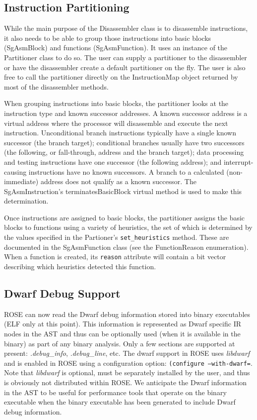 \subsection{Instruction Partitioning}

While the main purpose of the Disassembler class is to disassemble instructions, it also
needs to be able to group those instructions into basic blocks (SgAsmBlock) and functions
(SgAsmFunction). It uses an instance of the Partitioner class to do so.  The
user can supply a partitioner to the disassembler or have the disassembler create a
default partitioner on the fly.  The user is also free to call the partitioner directly
on the InstructionMap object returned by most of the disassembler methods.

When grouping instructions into basic blocks, the partitioner looks at the instruction
type and known successor addresses. A known successor address is a virtual address where
the processor will disassemble and execute the next instruction. Unconditional branch
instructions typically have a single known successor (the branch target); conditional
branches usually have two successors (the following, or fall-through, address and the
branch target); data processing and testing instructions have one successor (the
following address); and interrupt-causing instructions have no known successors. A branch
to a calculated (non-immediate) address does not qualify as a known successor. The
SgAsmInstruction's terminatesBasicBlock virtual method is used to make this
determination.

Once instructions are assigned to basic blocks, the partitioner assigns the basic blocks
to functions using a variety of heuristics, the set of which is determined by the values
specified in the Partioner's {\tt set\_heuristics} method. These are documented in the
SgAsmFunction class (see the FunctionReason enumeration).  When a function is
created, its {\tt reason} attribute will contain a bit vector describing which heuristics
detected this function.

\subsection{Dwarf Debug Support}

   ROSE can now read the Dwarf debug information stored into binary executables (ELF only
at this point). This information is represented as Dwarf specific IR nodes in the AST and
thus can be optionally used (when it is available in the binary) as part of any binary 
analysis.  Only a few sections are supported at present: {\em .debug\_info},
{\em .debug\_line}, etc.  The dwarf support in ROSE uses {\em libdwarf} and is enabled in
ROSE using a configuration option: {\tt (configure --with-dwarf={\em<path to libdwarf>}}.
Note that {\em libdwarf} is optional, must be separately installed by the user, and
thus is obviously not distributed within ROSE.  
We anticipate the Dwarf information in the AST to be useful for performance tools that
operate on the binary executable when the binary executable has been generated to include 
Dwarf debug information.

